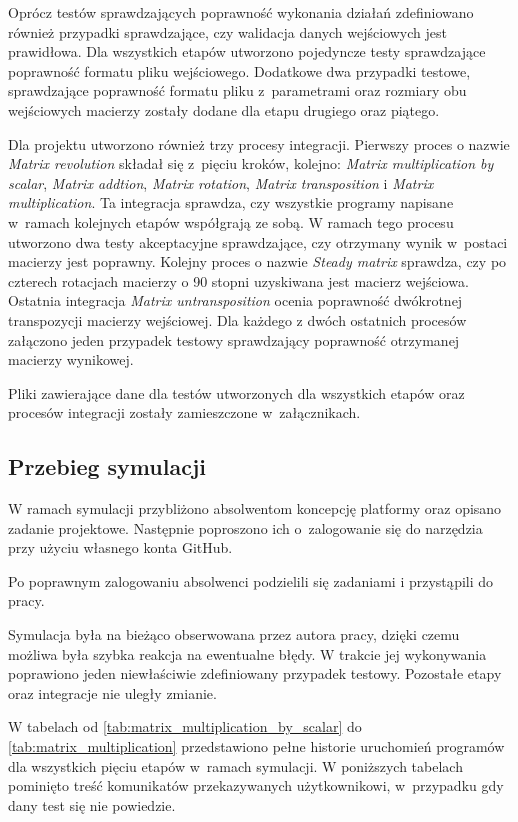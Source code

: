Oprócz testów sprawdzających poprawność wykonania działań zdefiniowano również przypadki sprawdzające, czy walidacja danych wejściowych jest prawidłowa.
Dla wszystkich etapów utworzono pojedyncze testy sprawdzające poprawność formatu pliku wejściowego.
Dodatkowe dwa przypadki testowe, sprawdzające poprawność formatu pliku z~parametrami oraz rozmiary obu wejściowych macierzy zostały dodane dla etapu drugiego oraz piątego.

Dla projektu utworzono również trzy procesy integracji.
Pierwszy proces o nazwie \textit{Matrix revolution} składał się z~pięciu kroków, kolejno: \textit{Matrix multiplication by scalar}, \textit{Matrix addtion}, \textit{Matrix rotation}, \textit{Matrix transposition} i \textit{Matrix multiplication}.
Ta integracja sprawdza, czy wszystkie programy napisane w~ramach kolejnych etapów współgrają ze sobą.
W ramach tego procesu utworzono dwa testy akceptacyjne sprawdzające, czy otrzymany wynik w~postaci macierzy jest poprawny.
Kolejny proces o nazwie \textit{Steady matrix} sprawdza, czy po czterech rotacjach macierzy o 90 stopni uzyskiwana jest macierz wejściowa.
Ostatnia integracja \textit{Matrix untransposition} ocenia poprawność dwókrotnej transpozycji macierzy wejściowej.
Dla każdego z dwóch ostatnich procesów załączono jeden przypadek testowy sprawdzający poprawność otrzymanej macierzy wynikowej.

Pliki zawierające dane dla testów utworzonych dla wszystkich etapów oraz procesów integracji zostały zamieszczone w~załącznikach.

\subsection{Przebieg symulacji}
\label{matrix_simulation}

W ramach symulacji przybliżono absolwentom koncepcję platformy oraz opisano zadanie projektowe.
Następnie poproszono ich o~zalogowanie się do narzędzia przy użyciu własnego konta GitHub.

Po poprawnym zalogowaniu absolwenci podzielili się zadaniami i przystąpili do pracy.

Symulacja była na bieżąco obserwowana przez autora pracy, dzięki czemu możliwa była szybka reakcja na ewentualne błędy.
W trakcie jej wykonywania poprawiono jeden niewłaściwie zdefiniowany przypadek testowy.
Pozostałe etapy oraz integracje nie uległy zmianie.

W tabelach od \ref{tab:matrix_multiplication_by_scalar} do \ref{tab:matrix_multiplication} przedstawiono pełne historie uruchomień programów dla wszystkich pięciu etapów w~ramach symulacji.
W poniższych tabelach pominięto treść komunikatów przekazywanych użytkownikowi, w~przypadku gdy dany test się nie powiedzie.


